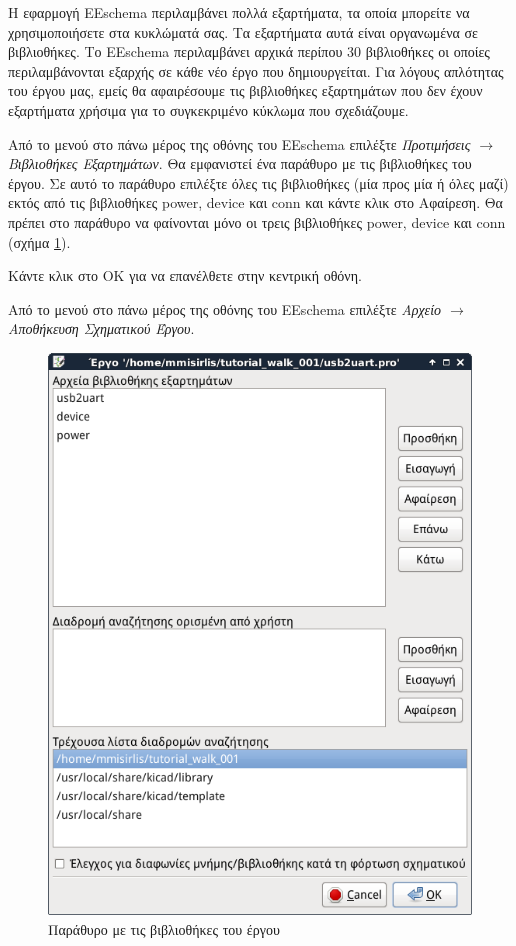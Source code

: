 \documentclass[a4paper]{article}
\begin{document}
Η εφαρμογή \textenglish{EEschema} περιλαμβάνει πολλά εξαρτήματα, τα οποία μπορείτε να χρησιμοποιήσετε στα κυκλώματά σας. Τα εξαρτήματα αυτά είναι οργανωμένα σε βιβλιοθήκες. Το \textenglish{EEschema} περιλαμβάνει αρχικά περίπου 30 βιβλιοθήκες οι οποίες περιλαμβάνονται εξαρχής σε κάθε νέο έργο που δημιουργείται. Για λόγους απλότητας του έργου μας, εμείς θα αφαιρέσουμε τις βιβλιοθήκες εξαρτημάτων που δεν έχουν εξαρτήματα χρήσιμα για το συγκεκριμένο κύκλωμα που σχεδιάζουμε.

Από το μενού στο πάνω μέρος της οθόνης του \textenglish{EEschema} επιλέξτε \textit{Προτιμήσεις $\rightarrow$ Βιβλιοθήκες Εξαρτημάτων}. Θα εμφανιστεί ένα παράθυρο με τις βιβλιοθήκες του έργου. Σε αυτό το παράθυρο επιλέξτε όλες τις βιβλιοθήκες (μία προς μία ή όλες μαζί) εκτός από τις βιβλιοθήκες power, device και conn και κάντε κλικ στο Αφαίρεση. Θα πρέπει στο παράθυρο να φαίνονται μόνο οι τρεις βιβλιοθήκες power, device και conn (σχήμα \ref{fig:eesch-dial-libr}). 

Κάντε κλικ στο ΟΚ για να επανέλθετε στην κεντρική οθόνη.

Από το μενού στο πάνω μέρος της οθόνης του \textenglish{EEschema} επιλέξτε \textit{Αρχείο $\rightarrow$ Αποθήκευση Σχηματικού Έργου}.

\begin{figure}
  \begin{center}
    \includegraphics[width=.5\textwidth]{img/eesch-dial-libr.png}
    \caption{Παράθυρο με τις βιβλιοθήκες του έργου}
    \label{fig:eesch-dial-libr}
  \end{center}
\end{figure}

\end{document}

